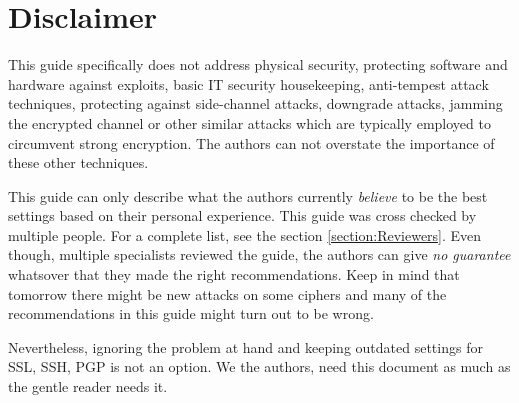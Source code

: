 \section{Disclaimer}
\label{section:disclaimer}
This guide specifically does not address physical security, protecting
software and hardware against exploits, basic IT security housekeeping,
anti-tempest\cite{Wikipedia:Tempest} attack techniques, protecting
against side-channel attacks, downgrade attacks, jamming the encrypted
channel or other similar attacks which are typically employed to
circumvent strong encryption. The authors can not overstate the
importance of these other techniques.

This guide can only describe what the authors currently \emph{believe} to be the best settings based on their personal experience. This guide was cross checked by multiple people. For a complete list, see the section \ref{section:Reviewers}. Even though, multiple specialists reviewed the guide, the authors can give \emph{no guarantee} whatsover that they made the right recommendations. Keep in mind that tomorrow there might be new attacks on some ciphers and many of the recommendations in this guide might turn out to be wrong.



Nevertheless, ignoring the problem at hand and keeping outdated settings for SSL, SSH, PGP is not an option. We the authors, need this document as much as the gentle reader needs it.

